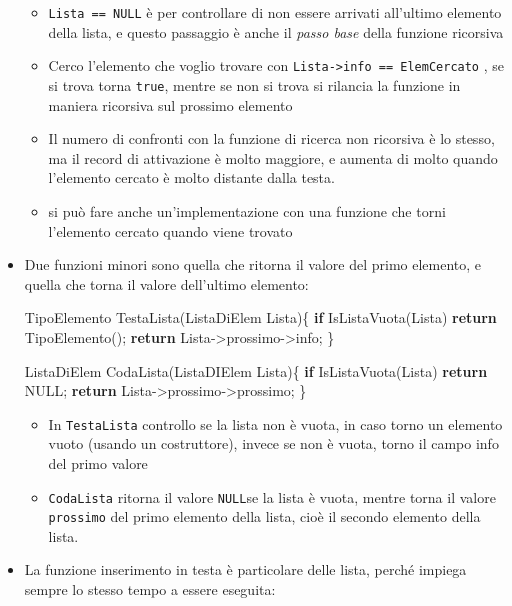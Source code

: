 \documentclass[
]{article}
\newenvironment{Shaded}{}{}
\newcommand{\ControlFlowTok}[1]{\textcolor[rgb]{0.00,0.44,0.13}{\textbf{#1}}}
\newcommand{\NormalTok}[1]{#1}
\begin{document}
\begin{itemize}
  \begin{itemize}
  \item
    \texttt{Lista\ ==\ NULL} è per controllare di non essere arrivati
    all'ultimo elemento della lista, e questo passaggio è anche il
    \emph{passo base} della funzione ricorsiva
  \item
    Cerco l'elemento che voglio trovare con
    \texttt{Lista-\textgreater{}info\ ==\ ElemCercato} , se si trova
    torna \texttt{true}, mentre se non si trova si rilancia la funzione
    in maniera ricorsiva sul prossimo elemento
  \item
    Il numero di confronti con la funzione di ricerca non ricorsiva è lo
    stesso, ma il record di attivazione è molto maggiore, e aumenta di
    molto quando l'elemento cercato è molto distante dalla testa.
  \item
    si può fare anche un'implementazione con una funzione che torni
    l'elemento cercato quando viene trovato
  \end{itemize}
\item
  Due funzioni minori sono quella che ritorna il valore del primo
  elemento, e quella che torna il valore dell'ultimo elemento:

\begin{Shaded}
\begin{Highlighting}[]
\NormalTok{TipoElemento TestaLista(ListaDiElem Lista)\{}
    \ControlFlowTok{if}\NormalTok{ IsListaVuota(Lista) }\ControlFlowTok{return}\NormalTok{ TipoElemento();}
    \ControlFlowTok{return}\NormalTok{ Lista{-}\textgreater{}prossimo{-}\textgreater{}info;}
\NormalTok{\}}

\NormalTok{ListaDiElem CodaLista(ListaDIElem Lista)\{}
    \ControlFlowTok{if}\NormalTok{ IsListaVuota(Lista) }\ControlFlowTok{return}\NormalTok{ NULL;}
    \ControlFlowTok{return}\NormalTok{ Lista{-}\textgreater{}prossimo{-}\textgreater{}prossimo;}
\NormalTok{\}}
\end{Highlighting}
\end{Shaded}

  \begin{itemize}
  \item
    In \texttt{TestaLista} controllo se la lista non è vuota, in caso
    torno un elemento vuoto (usando un costruttore), invece se non è
    vuota, torno il campo info del primo valore
  \item
    \texttt{CodaLista} ritorna il valore \texttt{NULL}se la lista è
    vuota, mentre torna il valore \texttt{prossimo} del primo elemento
    della lista, cioè il secondo elemento della lista.
  \end{itemize}
\item
  La funzione inserimento in testa è particolare delle lista, perché
  impiega sempre lo stesso tempo a essere eseguita:


\end{itemize}
\end{document}
